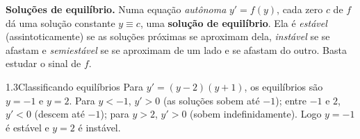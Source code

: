 \textbf{Soluções de equilíbrio.} Numa equação \emph{autônoma} $y'=f(y)$, cada zero $c$ de $f$
dá uma solução constante $y\equiv c$, uma \textbf{solução de equilíbrio}. Ela é \emph{estável} (assintoticamente) se as soluções
próximas se aproximam dela, \emph{instável} se se afastam e \emph{semiestável} se se aproximam
de um lado e se afastam do outro. Basta estudar o sinal de $f$.

\begin{exemplo}{1.3}{Classificando equilíbrios}
Para $y'=(y-2)(y+1)$, os equilíbrios são $y=-1$ e $y=2$. Para $y<-1$, $y'>0$ (as soluções
sobem até $-1$); entre $-1$ e $2$, $y'<0$ (descem até $-1$); para $y>2$, $y'>0$ (sobem
indefinidamente). Logo $y=-1$ é estável e $y=2$ é instável.
\end{exemplo}

